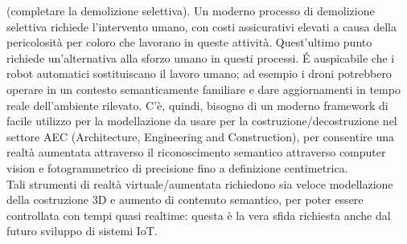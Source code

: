 (completare la demolizione selettiva). Un moderno processo di demolizione selettiva richiede l'intervento umano,
con costi assicurativi elevati a causa della pericolosità per coloro che lavorano in queste attività.
Quest'ultimo punto richiede un'alternativa alla sforzo umano in questi processi. \'E auspicabile che i robot automatici
sostituiscano il lavoro umano; ad esempio i droni potrebbero operare in un
contesto semanticamente familiare e dare aggiornamenti in tempo reale dell'ambiente rilevato.
C'è, quindi, bisogno di un moderno framework di facile utilizzo per la modellazione da usare per la
costruzione/decostruzione nel settore AEC (Architecture, Engineering and Construction),
per consentire una realtà aumentata attraverso il riconoscimento semantico attraverso computer vision e
fotogrammetrico di precisione fino a definizione centimetrica.\\
Tali strumenti di realtà virtuale/aumentata
richiedono sia veloce modellazione della costruzione 3D e aumento di contenuto semantico, per poter essere controllata con
tempi quasi realtime: questa è la vera sfida richiesta anche dal futuro sviluppo di sistemi IoT.
\newpage
